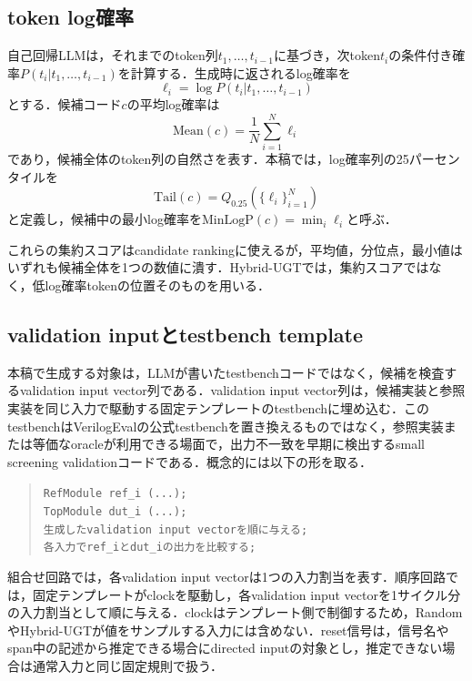 \documentclass[submit,techrep,noauthor]{ipsj}
\begin{document}
\subsection{token log確率}

自己回帰LLMは，それまでのtoken列$t_1,\ldots,t_{i-1}$に基づき，次token$t_i$の条件付き確率$P(t_i|t_1,\ldots,t_{i-1})$を計算する．生成時に返されるlog確率を
\begin{equation}
\ell_i = \log P(t_i|t_1,\ldots,t_{i-1})
\end{equation}
とする．候補コード$c$の平均log確率は
\begin{equation}
\mathrm{Mean}(c)=\frac{1}{N}\sum_{i=1}^{N}\ell_i
\end{equation}
であり，候補全体のtoken列の自然さを表す．本稿では，log確率列の25パーセンタイルを
\begin{equation}
\mathrm{Tail}(c)=Q_{0.25}(\{\ell_i\}_{i=1}^{N})
\end{equation}
と定義し，候補中の最小log確率を\(\mathrm{MinLogP}(c)=\min_i \ell_i\)と呼ぶ．

これらの集約スコアはcandidate rankingに使えるが，平均値，分位点，最小値はいずれも候補全体を1つの数値に潰す．Hybrid-UGTでは，集約スコアではなく，低log確率tokenの位置そのものを用いる．

\subsection{validation inputとtestbench template}

本稿で生成する対象は，LLMが書いたtestbenchコードではなく，候補を検査するvalidation input vector列である．validation input vector列は，候補実装と参照実装を同じ入力で駆動する固定テンプレートのtestbenchに埋め込む．このtestbenchはVerilogEvalの公式testbenchを置き換えるものではなく，参照実装または等価なoracleが利用できる場面で，出力不一致を早期に検出するsmall screening validationコードである．概念的には以下の形を取る．

\begin{quote}
\small
\texttt{RefModule ref\_i (...);}\\
\texttt{TopModule dut\_i (...);}\\
\texttt{生成したvalidation input vectorを順に与える;}\\
\texttt{各入力でref\_iとdut\_iの出力を比較する;}
\end{quote}

組合せ回路では，各validation input vectorは1つの入力割当を表す．順序回路では，固定テンプレートがclockを駆動し，各validation input vectorを1サイクル分の入力割当として順に与える．clockはテンプレート側で制御するため，RandomやHybrid-UGTが値をサンプルする入力には含めない．reset信号は，信号名やspan中の記述から推定できる場合にdirected inputの対象とし，推定できない場合は通常入力と同じ固定規則で扱う．
\end{document}
